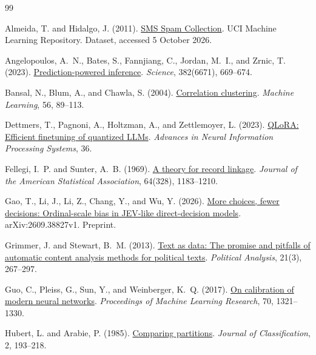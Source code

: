 \documentclass[UTF8,a4paper,zihao=-4,fontset=fandol]{ctexart}
\begin{document}
\clearpage
\begin{thebibliography}{99}
\small
{}

Almeida, T. and Hidalgo, J. (2011).
\href{https://doi.org/10.24432/C5CC84}{SMS Spam Collection}.
UCI Machine Learning Repository. Dataset, accessed 5 October 2026.

Angelopoulos, A.~N., Bates, S., Fannjiang, C., Jordan, M.~I., and Zrnic, T. (2023).
\href{https://doi.org/10.1126/science.adi6000}{Prediction-powered inference}.
\emph{Science}, 382(6671), 669--674.

Bansal, N., Blum, A., and Chawla, S. (2004).
\href{https://doi.org/10.1023/B:MACH.0000033116.57574.95}{Correlation clustering}.
\emph{Machine Learning}, 56, 89--113.

Dettmers, T., Pagnoni, A., Holtzman, A., and Zettlemoyer, L. (2023).
\href{https://proceedings.neurips.cc/paper_files/paper/2023/hash/1feb87871436031bdc0f2beaa62a049b-Abstract-Conference.html}{QLoRA: Efficient finetuning of quantized LLMs}.
\emph{Advances in Neural Information Processing Systems}, 36.

Fellegi, I.~P. and Sunter, A.~B. (1969).
\href{https://doi.org/10.1080/01621459.1969.10501049}{A theory for record linkage}.
\emph{Journal of the American Statistical Association}, 64(328), 1183--1210.

Gao, T., Li, J., Li, Z., Chang, Y., and Wu, Y. (2026).
\href{https://arxiv.org/abs/2609.38827v1}{More choices, fewer decisions: Ordinal-scale bias in JEV-like direct-decision models}.
arXiv:2609.38827v1. Preprint.

Grimmer, J. and Stewart, B.~M. (2013).
\href{https://doi.org/10.1093/pan/mps028}{Text as data: The promise and pitfalls of automatic content analysis methods for political texts}.
\emph{Political Analysis}, 21(3), 267--297.

Guo, C., Pleiss, G., Sun, Y., and Weinberger, K.~Q. (2017).
\href{https://proceedings.mlr.press/v70/guo17a.html}{On calibration of modern neural networks}.
\emph{Proceedings of Machine Learning Research}, 70, 1321--1330.

Hubert, L. and Arabie, P. (1985).
\href{https://doi.org/10.1007/BF01908075}{Comparing partitions}.
\emph{Journal of Classification}, 2, 193--218.


\end{thebibliography}
\end{document}
